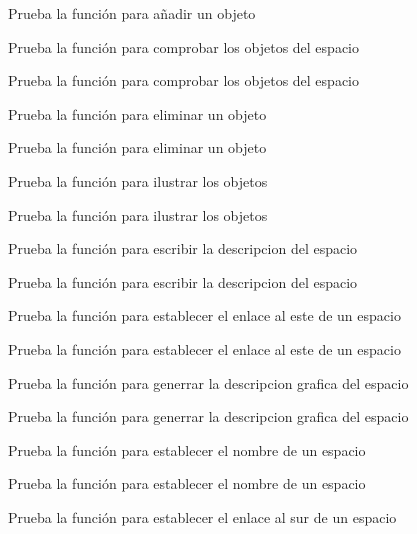 \begin{DoxyRefList}
Prueba la función para añadir un objeto  
\item[\label{test__test000080}%
\Hypertarget{test__test000080}%
Member \hyperlink{space__test_8c_ab10ca9900e9610c2af3b7a5348f58b9d}{test3\+\_\+space\+\_\+check\+\_\+object} ()]Prueba la función para comprobar los objetos del espacio 

Prueba la función para comprobar los objetos del espacio  
\item[\label{test__test000067}%
\Hypertarget{test__test000067}%
Member \hyperlink{space__test_8c_acc19a377af7a1e5dc4d8ce6c1f86bba8}{test3\+\_\+space\+\_\+delete\+\_\+object} ()]Prueba la función para eliminar un objeto 

Prueba la función para eliminar un objeto  
\item[\label{test__test000077}%
\Hypertarget{test__test000077}%
Member \hyperlink{space__test_8c_a6f9b5b63074aca2c0d522d4e034004ab}{test3\+\_\+space\+\_\+get\+\_\+gdesc\+\_\+illustration} ()]Prueba la función para ilustrar los objetos 

Prueba la función para ilustrar los objetos  
\item[\label{test__test000059}%
\Hypertarget{test__test000059}%
Member \hyperlink{space__test_8c_a2599e2fdd9abd61c410faeca649402e6}{test3\+\_\+space\+\_\+set\+\_\+description} ()]Prueba la función para escribir la descripcion del espacio 

Prueba la función para escribir la descripcion del espacio  
\item[\label{test__test000039}%
\Hypertarget{test__test000039}%
Member \hyperlink{space__test_8c_adf98486d8745110660515d14b71b5656}{test3\+\_\+space\+\_\+set\+\_\+east} ()]Prueba la función para establecer el enlace al este de un espacio 

Prueba la función para establecer el enlace al este de un espacio  
\item[\label{test__test000073}%
\Hypertarget{test__test000073}%
Member \hyperlink{space__test_8c_a11fbbc19249364545aa2c98b138fbcaa}{test3\+\_\+space\+\_\+set\+\_\+gdesc} ()]Prueba la función para generrar la descripcion grafica del espacio 

Prueba la función para generrar la descripcion grafica del espacio  
\item[\label{test__test000030}%
\Hypertarget{test__test000030}%
Member \hyperlink{space__test_8c_aa24a337830006e33706ab6ac1c416b47}{test3\+\_\+space\+\_\+set\+\_\+name} ()]Prueba la función para establecer el nombre de un espacio 

Prueba la función para establecer el nombre de un espacio  
\item[\label{test__test000033}%
\Hypertarget{test__test000033}%
Member \hyperlink{space__test_8c_ac2961dcc4d7645660ca6953a70315b0a}{test3\+\_\+space\+\_\+set\+\_\+north} ()]Prueba la función para establecer el enlace al sur de un espacio 


\end{DoxyRefList}
